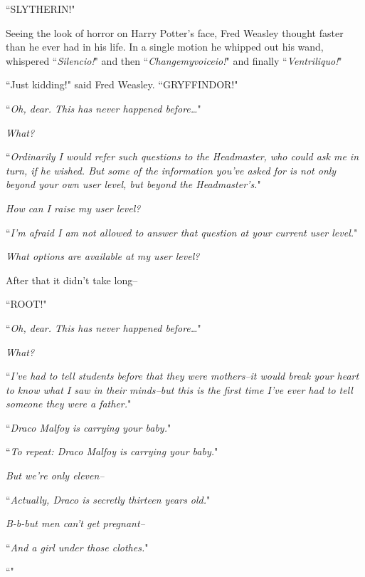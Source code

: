 ``SLYTHERIN!"

Seeing the look of horror on Harry Potter's face, Fred Weasley thought faster than he ever had in his life. In a single motion he whipped out his wand, whispered ``\emph{Silencio!}" and then ``\emph{Changemyvoiceio!}" and finally ``\emph{Ventriliquo!}"

``Just kidding!" said Fred Weasley. ``GRYFFINDOR!"

\later

``\emph{Oh, dear. This has never happened before{\ldots}}"

\emph{What?}

``\emph{Ordinarily I would refer such questions to the Headmaster, who could ask me in turn, if he wished. But some of the information you've asked for is not only beyond your own user level, but beyond the Headmaster's.}"

\emph{How can I raise my user level?}

``\emph{I'm afraid I am not allowed to answer that question at your current user level.}"

\emph{What options \emph{are} available at my user level?}

After that it didn't take long\---

``ROOT!"

\later

``\emph{Oh, dear. This has never happened before{\ldots}}"

\emph{What?}

``\emph{I've had to tell students before that they were mothers\---it would break your heart to know what I saw in their minds\---but this is the first time I've ever had to tell someone they were a father.}"

\emph{}

``\emph{Draco Malfoy is carrying your baby.}"

\emph{}

``\emph{To repeat: Draco Malfoy is carrying your baby.}"

\emph{But we're only eleven\---}

``\emph{Actually, Draco is secretly thirteen years old.}"

\emph{B-b-but men can't get pregnant\---}

``\emph{And a girl under those clothes.}"

\emph{}

``\emph{}"

